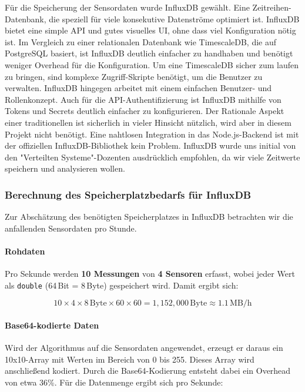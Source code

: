 Für die Speicherung der Sensordaten wurde InfluxDB gewählt. 
Eine Zeitreihen-Datenbank, die speziell für viele konsekutive Datenströme optimiert ist. 
InfluxDB bietet eine simple API und gutes visuelles UI, ohne dass viel Konfiguration nötig ist.
Im Vergleich zu einer relationalen Datenbank wie TimescaleDB, die auf PostgreSQL basiert,
ist InfluxDB deutlich einfacher zu handhaben und benötigt weniger Overhead für die Konfiguration.
Um eine TimescaleDB sicher zum laufen zu bringen, sind komplexe Zugriff-Skripte benötigt, um die Benutzer zu verwalten.
InfluxDB hingegen arbeitet mit einem einfachen Benutzer- und Rollenkonzept. 
Auch für die API-Authentifizierung ist InfluxDB mithilfe von Tokens und Secrets deutlich einfacher zu konfigurieren.
Der Rationale Aspekt einer traditionellen ist sicherlich in vieler Hinsicht nützlich, wird aber in diesem Projekt nicht benötigt.
Eine nahtlosen Integration in das Node.js-Backend ist mit der offiziellen InfluxDB-Bibliothek kein Problem.
InfluxDB wurde uns initial von den "Verteilten Systeme"-Dozenten ausdrücklich empfohlen, da wir viele Zeitwerte speichern und analysieren wollen.

\subsubsection*{Berechnung des Speicherplatzbedarfs für InfluxDB}

Zur Abschätzung des benötigten Speicherplatzes in InfluxDB betrachten wir die anfallenden Sensordaten pro Stunde.  

\paragraph{Rohdaten}  
Pro Sekunde werden \textbf{10 Messungen} von \textbf{4 Sensoren} erfasst, wobei jeder Wert als \texttt{double} (64\,Bit = 8\,Byte) gespeichert wird.  
Damit ergibt sich:  

\[
10 \times 4 \times 8 \,\text{Byte} \times 60 \times 60 
= 1{,}152{,}000 \,\text{Byte} \approx 1.1 \,\text{MB/h}
\]

\paragraph{Base64-kodierte Daten}  
Wird der Algorithmus auf die Sensordaten angewendet, erzeugt er daraus ein 10x10-Array mit Werten im Bereich von 0 bis 255. Dieses Array wird anschließend kodiert. Durch die Base64-Kodierung entsteht dabei ein Overhead von etwa 36\%. Für die Datenmenge ergibt sich pro Sekunde:  

